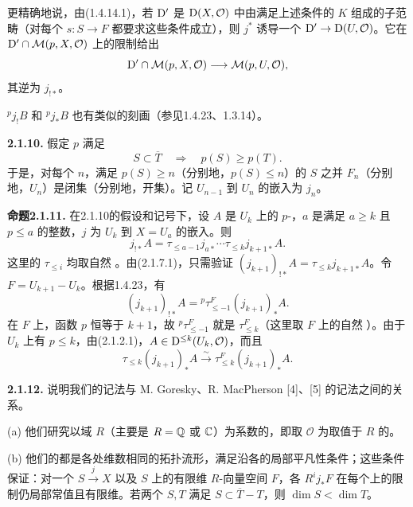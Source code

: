 更精确地说，由(1.4.14.1)，若 $\mathrm{D}'$ 是 $\mathrm{D}(X,\mathcal O)$ 中由满足上述条件的 $K$ 组成的子范畴（对每个 $s\colon S\to F$ 都要求这些条件成立），则 $j^*$ 诱导一个 $\mathrm{D}'\to\mathrm{D}(U,\mathcal O)$。它在 $\mathrm{D}'\cap\mathcal M(p,X,\mathcal O)$ 上的限制给出
\[
 \mathrm{D}'\cap\mathcal M(p,X,\mathcal O)\longrightarrow\mathcal M(p,U,\mathcal O),
\]
其逆为 $j_{!*}$。

${}^pj_!B$ 和 ${}^pj_*B$ 也有类似的刻画（参见1.4.23、1.3.14）。

\par\medskip\noindent\textbf{2.1.10.} 假定 $p$ 满足
\begin{equation*}
 S\subset\overline T\quad\Longrightarrow\quad p(S)\geq p(T).\tag{2.1.10.1}
\end{equation*}
于是，对每个 $n$，满足 $p(S)\geq n$（分别地，$p(S)\leq n$）的 $S$ 之并 $F_n$（分别地，$U_n$）是闭集（分别地，开集）。记 $U_{n-1}$ 到 $U_n$ 的嵌入为 $j_n$。

\par\medskip\noindent\textbf{命题2.1.11.} 在2.1.10的假设和记号下，设 $A$ 是 $U_k$ 上的 $p$-，$a$ 是满足 $a\geq k$ 且 $p\leq a$ 的整数，$j$ 为 $U_k$ 到 $X=U_a$ 的嵌入。则
\[
 j_{!*}A=\tau_{\leq a-1}j_{a*}\cdots\tau_{\leq k}j_{k+1*}A.
\]
这里的 $\tau_{\leq i}$ 均取自然 。由(2.1.7.1)，只需验证 $(j_{k+1})_{!*}A=\tau_{\leq k}j_{k+1*}A$。令 $F=U_{k+1}-U_k$。根据1.4.23，有
\[
 (j_{k+1})_{!*}A={}^p\tau^F_{\leq-1}(j_{k+1})_*A.
\]
在 $F$ 上，函数 $p$ 恒等于 $k+1$，故 ${}^p\tau^F_{\leq-1}$ 就是 $\tau^F_{\leq k}$（这里取 $F$ 上的自然 ）。由于 $U_k$ 上有 $p\leq k$，由(2.1.2.1)，$A\in\mathrm{D}^{\leq k}(U_k,\mathcal O)$，而且
\[
 \tau_{\leq k}(j_{k+1})_*A\xrightarrow{\sim}
 \tau^F_{\leq k}(j_{k+1})_*A.
\]

\par\medskip\noindent\textbf{2.1.12.} 说明我们的记法与 M. Goresky、R. MacPherson [4]、[5] 的记法之间的关系。

(a) 他们研究以域 $R$（主要是 $R=\mathbb Q$ 或 $\mathbb C$）为系数的，即取 $\mathcal O$ 为取值于 $R$ 的。

(b) 他们的都是各处维数相同的拓扑流形，满足沿各的局部平凡性条件；这些条件保证：对一个 $S\xrightarrow{j}X$ 以及 $S$ 上的有限维 $R$-向量空间 $F$，各 $R^ij_*F$ 在每个上的限制仍局部常值且有限维。若两个 $S,T$ 满足 $S\subset\overline T-T$，则 $\dim S<\dim T$。

